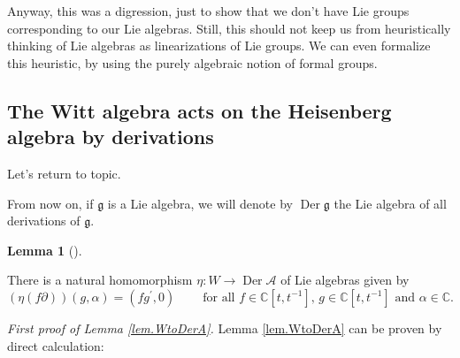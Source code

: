 \documentclass
[numbers=enddot,12pt,final,onecolumn,german,notitlepage]{scrartcl}%
\theoremstyle{definition}
\newtheorem{lem}[theo]{Lemma}
\newenvironment{lemma}[1][]
{\begin{lem}[#1]\begin{leftbar}}
{\end{leftbar}\end{lem}}
\begin{document}
Anyway, this was a digression, just to show that we don't have Lie groups
corresponding to our Lie algebras. Still, this should not keep us from
heuristically thinking of Lie algebras as linearizations of Lie groups. We can
even formalize this heuristic, by using the purely algebraic notion of formal groups.

\subsection{The Witt algebra acts on the Heisenberg algebra by derivations}

Let's return to topic.

From now on, if $\mathfrak{g}$ is a Lie algebra, we will denote by
$\operatorname*{Der}\mathfrak{g}$ the Lie algebra of all derivations of
$\mathfrak{g}$.

\begin{lemma}
\label{lem.WtoDerA}There is a natural homomorphism $\eta:W\rightarrow
\operatorname*{Der}\mathcal{A}$ of Lie algebras given by
\[
\left(  \eta\left(  f\partial\right)  \right)  \left(  g,\alpha\right)
=\left(  fg^{\prime},0\right)  \ \ \ \ \ \ \ \ \ \ \text{for all }%
f\in\mathbb{C}\left[  t,t^{-1}\right]  \text{, }g\in\mathbb{C}\left[
t,t^{-1}\right]  \text{ and }\alpha\in\mathbb{C}.
\]

\end{lemma}

\textit{First proof of Lemma \ref{lem.WtoDerA}.} Lemma \ref{lem.WtoDerA} can
be proven by direct calculation:
\end{document}
